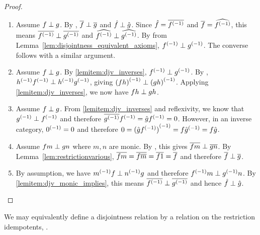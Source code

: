 \begin{proof}
  \prepprooflist
  \begin{enumerate}[{(}i{)}]
    \item Assume $f \perp g$. By , $\overline{f} \perp \overline{g}$ and
      $\hat{f}\perp\hat{g}$. Since $\hat{f} = \overline{{f}^{(-1)}}$ and $\overline{f} = \widehat{{f}^{(-1)}}$, this
      means $\overline{{f}^{(-1)}} \perp \overline{{g}^{(-1)}}$ and $\widehat{{f}^{(-1)}}\perp\widehat{{g}^{(-1)}}$. By
       from Lemma~\ref{lem:disjointness_equivalent_axioms},
      ${f}^{(-1)} \perp {g}^{(-1)}$. The converse follows with  a similar argument.
    \item Assume $f \perp g$. By \ref{lemitem:djv_inverses}, ${f}^{(-1)}\perp{g}^{(-1)}$. By
      , ${h}^{(-1)}{f}^{(-1)}\perp{h}^{(-1)}{g}^{(-1)}$, giving ${(f h)}^{(-1)} \perp
      {(g h)}^{(-1)}$. Applying \ref{lemitem:djv_inverses}, we now have $f h \perp g h$.
    \item Assume $f \perp g$. From \ref{lemitem:djv_inverses} and reflexivity, we know that
      ${g}^{(-1)} \perp {f}^{(-1)}$ and therefore $\overline{{g}^{(-1)}}{f}^{(-1)} = \hat{g}{f}^{(-1)}= 0$. However, in
      an inverse category, ${0}^{(-1)} = 0$ and therefore $0 = {(\hat{g}{f}^{(-1)})}^{(-1)} = f {\hat{g}}^{(-1)} =
      f \hat{g}$.
    \item Assume $f m \perp g n$ where $m, n$ are monic. By , this gives
      $\overline{f m} \perp \overline{g n}$. By Lemma~\ref{lem:restrictionvarious},
      $\overline{f m} = \overline{f \overline{m}} = \overline{f 1} = \overline{f}$ and therefore $\overline{f} \perp \overline{g}$.
    \item By assumption, we have ${m}^{(-1)} f \perp  {n}^{(-1)}g$ and therefore ${f}^{(-1)}m \perp
      {g}^{(-1)} n$. By \ref{lemitem:djv_monic_implies}, this means $\overline{{f}^{(-1)}} \perp
      \overline{{g}^{(-1)}}$ and hence $\hat{f} \perp \hat{g}$.
  \end{enumerate}
\end{proof}

We may equivalently define a disjointness relation by a relation on the restriction idempotents, .


